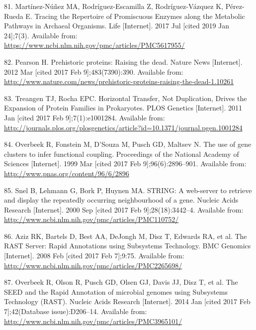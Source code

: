 \documentclass[12pt,twoside]{reedthesis}
\begin{document}
  \hypertarget{ref-martinez-nunez_promiscuity_Archaea_2017}{}
  81. Martínez-Núñez MA, Rodríguez-Escamilla Z, Rodríguez-Vázquez K,
  Pérez-Rueda E. Tracing the Repertoire of Promiscuous Enzymes along the
  Metabolic Pathways in Archaeal Organisms. Life {[}Internet{]}. 2017 Jul
  {[}cited 2019 Jan 24{]};7(3). Available from:
  \url{https://www.ncbi.nlm.nih.gov/pmc/articles/PMC5617955/}
  
  \hypertarget{ref-pearson_prehistoric_2012}{}
  82. Pearson H. Prehistoric proteins: Raising the dead. Nature News
  {[}Internet{]}. 2012 Mar {[}cited 2017 Feb 9{]};483(7390):390. Available
  from:
  \url{http://www.nature.com/news/prehistoric-proteins-raising-the-dead-1.10261}
  
  \hypertarget{ref-treangen_horizontal_2011}{}
  83. Treangen TJ, Rocha EPC. Horizontal Transfer, Not Duplication, Drives
  the Expansion of Protein Families in Prokaryotes. PLOS Genetics
  {[}Internet{]}. 2011 Jan {[}cited 2017 Feb 9{]};7(1):e1001284. Available
  from:
  \url{http://journals.plos.org/plosgenetics/article?id=10.1371/journal.pgen.1001284}
  
  \hypertarget{ref-overbeek_use_1999}{}
  84. Overbeek R, Fonstein M, D'Souza M, Pusch GD, Maltsev N. The use of
  gene clusters to infer functional coupling. Proceedings of the National
  Academy of Sciences {[}Internet{]}. 1999 Mar {[}cited 2017 Feb
  9{]};96(6):2896--901. Available from:
  \url{http://www.pnas.org/content/96/6/2896}
  
  \hypertarget{ref-snel_string_2000}{}
  85. Snel B, Lehmann G, Bork P, Huynen MA. STRING: A web-server to
  retrieve and display the repeatedly occurring neighbourhood of a gene.
  Nucleic Acids Research {[}Internet{]}. 2000 Sep {[}cited 2017 Feb
  9{]};28(18):3442--4. Available from:
  \url{http://www.ncbi.nlm.nih.gov/pmc/articles/PMC110752/}
  
  \hypertarget{ref-aziz_rast_2008}{}
  86. Aziz RK, Bartels D, Best AA, DeJongh M, Disz T, Edwards RA, et al.
  The RAST Server: Rapid Annotations using Subsystems Technology. BMC
  Genomics {[}Internet{]}. 2008 Feb {[}cited 2017 Feb 7{]};9:75. Available
  from: \url{http://www.ncbi.nlm.nih.gov/pmc/articles/PMC2265698/}
  
  \hypertarget{ref-overbeek_seed_2014}{}
  87. Overbeek R, Olson R, Pusch GD, Olsen GJ, Davis JJ, Disz T, et al.
  The SEED and the Rapid Annotation of microbial genomes using Subsystems
  Technology (RAST). Nucleic Acids Research {[}Internet{]}. 2014 Jan
  {[}cited 2017 Feb 7{]};42(Database issue):D206--14. Available from:
  \url{http://www.ncbi.nlm.nih.gov/pmc/articles/PMC3965101/}
  
\end{document}
